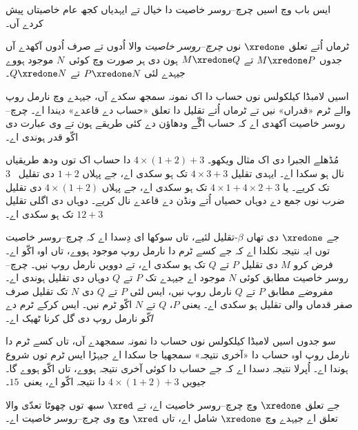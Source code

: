 \documentclass[../../../include/open-logic-section]{subfiles}
\begin{document}


ایس باب وچ اسیں چرچ–روسر خاصیت دا خیال تے ایہدیاں کجھ
عام خاصیتاں پیش کردے آں۔

\begin{defn}
  ٹرماں اُتے تعلق $\xredone$ نوں \emph{چرچ–روسر خاصیت} والا
  اُدوں تے صرف اُدوں آکھدے آں جدوں $M \xredone P$ تے
  $M \xredone Q$ ہون دی ہر صورت وچ کوئی~$N$ موجود ہووے
  جیہدے لئی $P \xredone N$ تے $Q \xredone N$۔
\end{defn}

اسیں لامبڈا کیلکولس نوں حساب دا اک نمونہ سمجھ سکدے آں،
جیہدے وچ نارمل روپ والے ٹرم «قدراں» نیں تے ٹرماں اُتے
تقلیل دا تعلق «حساب دے قاعدے» دیندا اے۔ چرچ–روسر خاصیت
آکھدی اے کہ حساب اگّے ودھاؤن دے کئی طریقے ہون تے وی عبارت
دی اکّو قدر ہوندی اے۔

مُڈھلے الجبرا دی اک مثال ویکھو۔ $4 \times (1+2) + 3$ دا
حساب اک توں ودھ طریقیاں نال ہو سکدا اے۔ ایہدی تقلیل
$4
\times 3+3$ تک ہو سکدی اے، جے پہلاں $1+2$ دی تقلیل
~$3$ تک کریے۔ یا $4 \times 1+4
\times 2+3$ تک ہو سکدی اے، جے پہلاں $4 \times (1+2)$ دی
تقلیل ضرب نوں جمع دے دوہاں حصیاں اُتے ونڈن دے قاعدے نال کریے۔ دوہاں دی اگلی تقلیل
$12+3$ تک ہو سکدی اے۔

جے $\xredone$ دی تھاں $\beta$-تقلیل لئیے، تاں سوکھا ای
دِسدا اے کہ چرچ–روسر خاصیت توں ایہ نتیجہ نکلدا اے کہ جے
کسے ٹرم دا نارمل روپ موجود ہووے، تاں اوہ اکّو اے۔ فرض کرو
$M$ دی تقلیل $P$ تے $Q$ تک ہو سکدی اے، تے دوویں نارمل
روپ نیں۔ چرچ–روسر خاصیت مطابق کوئی $N$ موجود اے جیہدے
تک $P$ تے $Q$ دوہاں دی تقلیل ہوندی اے۔ مفروضے مطابق $P$
تے $Q$ نارمل روپ نیں، ایس لئی $P$ تے $Q$ دی $N$ تک
تقلیل صرف صفر قدماں والی تقلیل ہو سکدی اے۔ یعنی $P$،
$Q$ تے $N$ اکّو ٹرم نیں۔ ایس کرکے ٹرم دے \emph{اکّو}
نارمل روپ دی گل کرنا ٹھیک اے۔

سو جدوں اسیں لامبڈا کیلکولس نوں حساب دا نمونہ سمجھدے آں،
تاں کسے ٹرم دا نارمل روپ اوہ حساب دا «آخری نتیجہ» سمجھیا
جا سکدا اے جیہڑا ایس ٹرم توں شروع ہوندا اے۔ اُپرلا نتیجہ
دسدا اے کہ جے حساب دا کوئی آخری نتیجہ ہووے، تاں اکّو
ہووے گا۔ جیویں $4 \times (1+2)+3$ دا نتیجہ اکّو اے،
یعنی~$15$۔

\begin{thm} 
  جے تعلق $\xredone$ وچ چرچ–روسر خاصیت اے، تے $\xred$
  سبھ توں چھوٹا تعدّی والا تعلق اے جیہدے وچ $\xredone$
  شامل اے، تاں $\xred$ وچ وی چرچ–روسر خاصیت اے۔
\end{thm}
\end{document}
